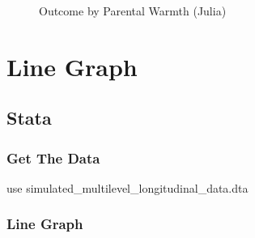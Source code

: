 \documentclass[
  letterpaper,
  DIV=11,
  numbers=noendperiod]{scrreprt}
\newenvironment{Shaded}{\begin{snugshade}}{\end{snugshade}}
\newcommand{\KeywordTok}[1]{\textcolor[rgb]{0.00,0.23,0.31}{#1}}
\newcommand{\NormalTok}[1]{\textcolor[rgb]{0.00,0.23,0.31}{#1}}
\begin{document}
\begin{figure}[H]


\caption{\label{fig-Julia}Outcome by Parental Warmth (Julia)}

\end{figure}%

\section{Line Graph}\label{line-graph}

\subsection{Stata}

\subsubsection{Get The Data}\label{get-the-data-3}

\begin{Shaded}
\begin{Highlighting}[]

\KeywordTok{use}\NormalTok{ simulated\_multilevel\_longitudinal\_data.dta}
\end{Highlighting}
\end{Shaded}

\subsubsection{Line Graph}\label{line-graph-1}
\end{document}
